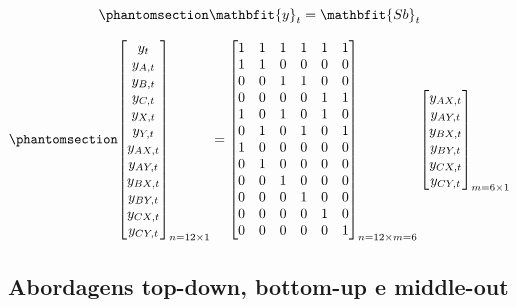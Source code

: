 \documentclass[
  12pt,
  twoside,
  openright,
  a4paper,
  chapter=TITLE,
  section=TITLE,
  brazil]{abntex2}
\begin{document}
\begin{equation}\phantomsection\label{eq-vetor_b}{
\mathbfit{y}_t=\mathbfit{Sb}_t
}\end{equation}

\begin{equation}\phantomsection\label{eq-matriz_ha}{
\begin{bmatrix}
    y_{t} \\
    y_{A, t} \\
    y_{B, t} \\
    y_{C, t} \\
    y_{X, t} \\
    y_{Y, t} \\
    y_{AX, t} \\
    y_{AY, t} \\
    y_{BX, t} \\
    y_{BY, t} \\
    y_{CX, t} \\
    y_{CY, t}
\end{bmatrix}_{n=12 \times 1}
=
\begin{bmatrix}
    1 & 1 & 1 & 1 & 1 & 1 \\
    1 & 1 & 0 & 0 & 0 & 0 \\
    0 & 0 & 1 & 1 & 0 & 0 \\
    0 & 0 & 0 & 0 & 1 & 1 \\
    1 & 0 & 1 & 0 & 1 & 0 \\
    0 & 1 & 0 & 1 & 0 & 1 \\
    1 & 0 & 0 & 0 & 0 & 0 \\
    0 & 1 & 0 & 0 & 0 & 0 \\
    0 & 0 & 1 & 0 & 0 & 0 \\
    0 & 0 & 0 & 1 & 0 & 0 \\
    0 & 0 & 0 & 0 & 1 & 0 \\
    0 & 0 & 0 & 0 & 0 & 1 \\
\end{bmatrix}_{n=12 \times m=6}
\begin{bmatrix}
    y_{AX, t} \\
    y_{AY, t} \\
    y_{BX, t} \\
    y_{BY, t} \\
    y_{CX, t} \\
    y_{CY, t}
\end{bmatrix}_{m=6 \times 1}
}\end{equation}

\subsection{Abordagens top-down, bottom-up e
middle-out}\label{abordagens-top-down-bottom-up-e-middle-out}
\end{document}
